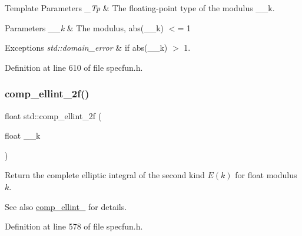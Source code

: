 \begin{DoxyTemplParams}{Template Parameters}
{\em \+\_\+\+Tp} & The floating-\/point type of the modulus {\ttfamily \+\_\+\+\_\+k}. \\
\hline
\end{DoxyTemplParams}

\begin{DoxyParams}{Parameters}
{\em \+\_\+\+\_\+k} & The modulus, {\ttfamily abs(\+\_\+\+\_\+k)} $<$= 1 \\
\hline
\end{DoxyParams}

\begin{DoxyExceptions}{Exceptions}
{\em std\+::domain\+\_\+error} & if {\ttfamily abs(\+\_\+\+\_\+k)} $>$ 1. \\
\hline
\end{DoxyExceptions}


Definition at line 610 of file specfun.\+h.

\mbox{\label{group__tr29124__math__spec__func_ga21700f2f125c42b1f1da1f9c7eea1135}} 
\subsubsection{\texorpdfstring{comp\+\_\+ellint\+\_\+2f()}{comp\_ellint\_2f()}}
{\footnotesize\ttfamily float std\+::comp\+\_\+ellint\+\_\+2f (\begin{DoxyParamCaption}\item[{float}]{\+\_\+\+\_\+k }\end{DoxyParamCaption})\hspace{0.3cm}{\ttfamily [inline]}}

Return the complete elliptic integral of the second kind $ E(k) $ for {\ttfamily float} modulus $ k $.

\begin{DoxySeeAlso}{See also}
\hyperlink{group__tr29124__math__spec__func_gaadf288465eea84ec609d93de96200aaa}{comp\+\_\+ellint\+\_} for details. 
\end{DoxySeeAlso}


Definition at line 578 of file specfun.\+h.

